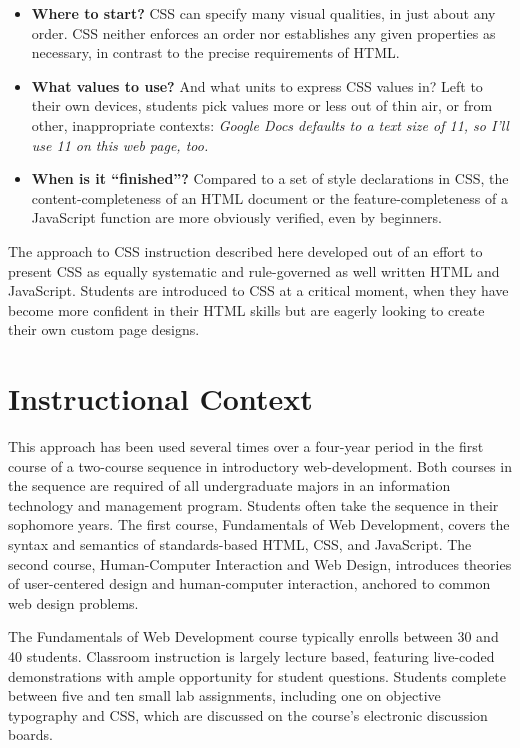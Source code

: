 \documentclass[sigplan,screen]{acmart}
\begin{document}
\begin{itemize}
  \item \textbf{Where to start?} CSS can specify many visual qualities,  in just about any order. CSS neither enforces an order nor establishes any given properties as necessary, in contrast to the precise requirements of HTML.
  \item \textbf{What values to use?} And what units to express CSS values in? Left to their own devices, students pick values more or less out of thin air, or from other, inappropriate contexts: {\itshape Google Docs defaults to a text size of 11, so I’ll use 11 on this web page, too.}
  \item \textbf{When is it “finished”?} Compared to a set of style declarations in CSS, the content-completeness of an HTML document or the feature-completeness of a JavaScript function are more obviously verified, even by beginners.
\end{itemize}

The approach to CSS instruction described here developed out of an effort to present CSS as equally systematic and rule-governed as well written HTML and JavaScript. Students are introduced to CSS at a critical moment, when they have become more confident in their HTML skills but are eagerly looking to create their own custom page designs.


\section{Instructional Context}

This approach has been used several times over a four-year period in the first course of a two-course sequence in introductory web-development. Both courses in the sequence are required of all undergraduate majors in an information technology and management program. Students often take the sequence in their sophomore years. The first course, Fundamentals of Web Development, covers the syntax and semantics of standards-based HTML, CSS, and JavaScript. The second course, Human-Computer Interaction and Web Design, introduces theories of user-centered design and human-computer interaction, anchored to common web design problems.

The Fundamentals of Web Development course typically enrolls between 30 and 40 students. Classroom instruction is largely lecture based, featuring live-coded demonstrations with ample opportunity for student questions. Students complete between five and ten small lab assignments, including one on objective typography and CSS, which are discussed on the course's electronic discussion boards. 
\end{document}
